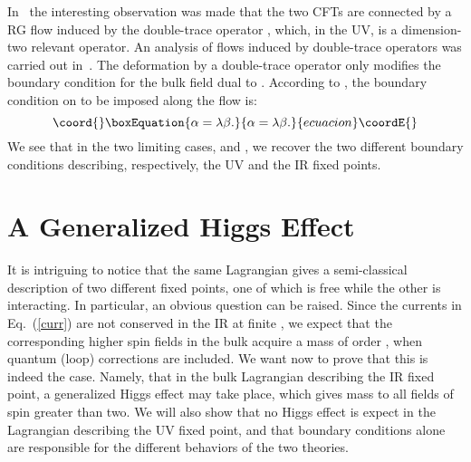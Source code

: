 \documentclass[a4paper,12pt]{article}
\begin{document}
In~\cite{kp} the interesting observation was made that the two CFTs
are connected by a RG flow induced by the double-trace operator
\coordHE{}, which, in the UV, is a dimension-two relevant
operator. An analysis of flows induced by double-trace operators was
carried out in~\cite{silverstein,wdouble,berkooz}. The deformation by
a double-trace operator only modifies the boundary condition for the
bulk field \myHighlight{$\Sigma$}\coordHE{} dual to \coordHE{}.  According to
\cite{wdouble}, the boundary condition on \myHighlight{$\Sigma$}\coordHE{} to be imposed along
the flow is:
\begin{equation}\coord{}\boxEquation{
\alpha=\lambda \beta .
\label{flow}
}{
\alpha=\lambda \beta .
}{ecuacion}\coordE{}\end{equation}
We see that in the two limiting cases, \coordHE{} and
\myHighlight{$\lambda=\infty$}\coordHE{}, we recover the two different boundary conditions
describing, respectively, the UV and the IR fixed points.

\section{A Generalized Higgs Effect}

It is intriguing to notice that the same Lagrangian gives a
semi-classical description of two different fixed points, one of which
is free while the other is interacting. In particular, an obvious
question can be raised.  Since the currents in Eq.~(\ref{curr}) are
not conserved in the IR at finite \coordHE{}, we expect that the
corresponding higher spin fields in the bulk acquire a mass of order
\coordHE{}, when quantum (loop) corrections are included.  We want now to
prove that this is indeed the case. Namely, that in the bulk
Lagrangian describing the IR fixed point, a generalized Higgs effect
may take place, which gives mass to all fields of spin greater than
two.  We will also show that no Higgs effect is expect in the
Lagrangian describing the UV fixed point, and that boundary conditions
alone are responsible for the different behaviors of the two theories.
\end{document}
